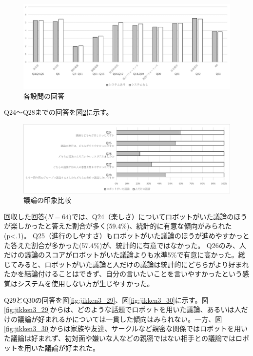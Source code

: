 \documentclass[11pt, a4paper]{jreport} %
\begin{document}
\begin{figure}[htbp]
\begin{center}
\includegraphics[width=150mm]{images/jikken3_situ.png}
\caption{各設問の回答}
\label{fig:jikken3_situ}
\end{center}
\end{figure}



Q24～Q28までの回答を図\ref{fig:jikken3_hikaku}に示す。


\begin{figure}[htbp]
\begin{center}
\includegraphics[width=150mm]{images/jikken3_hikaku.png}
\caption{議論の印象比較}
\label{fig:jikken3_hikaku}
\end{center}
\end{figure}

回収した回答($N=64$)では、Q24（楽しさ）についてロボットがいた議論のほうが楽しかったと答えた割合が多く(59.4\%)、統計的に有意な傾向がみられた(p<.1)。
Q25（進行のしやすさ）もロボットがいた議論のほうが進めやすかっとた答えた割合が多かった(57.4\%)が、統計的に有意ではなかった。
Q26のみ、人だけの議論のスコアがロボットがいた議論よりも水準5\%で有意に高かった。総じてみると、ロボットがいた議論と人だけの議論は統計的にどちらがより好まれたかを結論付けることはできず、自分の言いたいことを言いやすかったという感覚はシステムを使用しない方が生じやすかった。


Q29とQ30の回答を図\ref{fig:jikken3_29}、図\ref{fig:jikken3_30}に示す。図\ref{fig:jikken3_29}からは、どのような話題でロボットを用いた議論、あるいは人だけの議論が好まれるかについては一貫した傾向はみられない。一方、図\ref{fig:jikken3_30}からは家族や友達、サークルなど親密な関係ではロボットを用いた議論は好まれず、初対面や嫌いな人などの親密ではない相手との議論ではロボットを用いた議論が好まれた。
\end{document}
